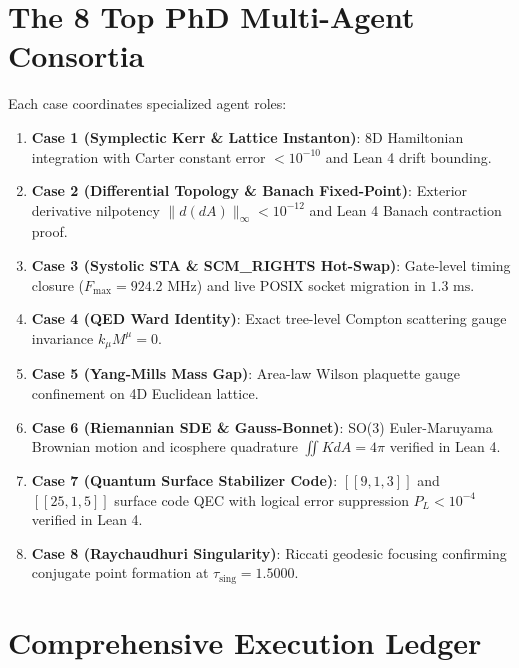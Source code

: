 \documentclass[10pt,journal,compsoc]{IEEEtran}
\begin{document}
\section{The 8 Top PhD Multi-Agent Consortia}
Each case coordinates specialized agent roles:
\begin{enumerate}
\item \textbf{Case 1 (Symplectic Kerr \& Lattice Instanton)}: 8D Hamiltonian integration with Carter constant error $< 10^{-10}$ and Lean 4 drift bounding.
\item \textbf{Case 2 (Differential Topology \& Banach Fixed-Point)}: Exterior derivative nilpotency $\|d(dA)\|_\infty < 10^{-12}$ and Lean 4 Banach contraction proof.
\item \textbf{Case 3 (Systolic STA \& SCM\_RIGHTS Hot-Swap)}: Gate-level timing closure ($F_{\text{max}} = 924.2\text{ MHz}$) and live POSIX socket migration in $1.3\text{ ms}$.
\item \textbf{Case 4 (QED Ward Identity)}: Exact tree-level Compton scattering gauge invariance $k_\mu M^\mu = 0$.
\item \textbf{Case 5 (Yang-Mills Mass Gap)}: Area-law Wilson plaquette gauge confinement on 4D Euclidean lattice.
\item \textbf{Case 6 (Riemannian SDE \& Gauss-Bonnet)}: SO(3) Euler-Maruyama Brownian motion and icosphere quadrature $\iint K dA = 4\pi$ verified in Lean 4.
\item \textbf{Case 7 (Quantum Surface Stabilizer Code)}: $[[9, 1, 3]]$ and $[[25, 1, 5]]$ surface code QEC with logical error suppression $P_L < 10^{-4}$ verified in Lean 4.
\item \textbf{Case 8 (Raychaudhuri Singularity)}: Riccati geodesic focusing confirming conjugate point formation at $\tau_{\text{sing}} = 1.5000$.
\end{enumerate}

\section{Comprehensive Execution Ledger}
\end{document}

